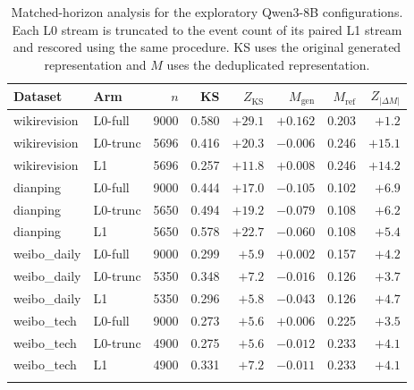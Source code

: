 \begin{table}[t]
\centering
\small
\caption{Matched-horizon analysis for the exploratory Qwen3-8B configurations. Each L0 stream is truncated to the event count of its paired L1 stream and rescored using the same procedure. KS uses the original generated representation and $M$ uses the deduplicated representation.}
\label{tab:matched-horizon}
\begin{tabular}{llrrrrrr}
\toprule
Dataset & Arm & $n$ & KS & $Z_{\mathrm{KS}}$ & $M_{\mathrm{gen}}$ & $M_{\mathrm{ref}}$ & $Z_{|\Delta M|}$ \\
\midrule
wikirevision & L0-full & 9000 & 0.580 & $+29.1$ & $+0.162$ & 0.203 & $+1.2$ \\
wikirevision & L0-trunc & 5696 & 0.416 & $+20.3$ & $-0.006$ & 0.246 & $+15.1$ \\
wikirevision & L1 & 5696 & 0.257 & $+11.8$ & $+0.008$ & 0.246 & $+14.2$ \\
\addlinespace
dianping & L0-full & 9000 & 0.444 & $+17.0$ & $-0.105$ & 0.102 & $+6.9$ \\
dianping & L0-trunc & 5650 & 0.494 & $+19.2$ & $-0.079$ & 0.108 & $+6.2$ \\
dianping & L1 & 5650 & 0.578 & $+22.7$ & $-0.060$ & 0.108 & $+5.4$ \\
\addlinespace
weibo\_daily & L0-full & 9000 & 0.299 & $+5.9$ & $+0.002$ & 0.157 & $+4.2$ \\
weibo\_daily & L0-trunc & 5350 & 0.348 & $+7.2$ & $-0.016$ & 0.126 & $+3.7$ \\
weibo\_daily & L1 & 5350 & 0.296 & $+5.8$ & $-0.043$ & 0.126 & $+4.7$ \\
\addlinespace
weibo\_tech & L0-full & 9000 & 0.273 & $+5.6$ & $+0.006$ & 0.225 & $+3.5$ \\
weibo\_tech & L0-trunc & 4900 & 0.275 & $+5.6$ & $-0.012$ & 0.233 & $+4.1$ \\
weibo\_tech & L1 & 4900 & 0.331 & $+7.2$ & $-0.011$ & 0.233 & $+4.1$ \\
\addlinespace
\bottomrule
\end{tabular}
\end{table}
